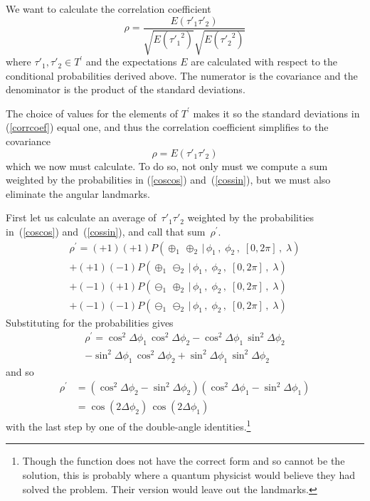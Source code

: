 \documentclass[9pt,technote]{IEEEtran}
\begin{document}
We want to calculate the correlation coefficient
\begin{equation}
  \label{corrcoef}
  \rho = \frac{E(\tau'_1 \tau'_2)}{\sqrt{E({\tau'_1}^2)}\sqrt{E({\tau'_2}^2)}}
\end{equation}
where $\tau'_1, \tau'_2 \in T^{\prime}$ and the expectations $E$ are
calculated with respect to the conditional probabilities derived
above. The numerator is the covariance and the denominator is the
product of the standard deviations.

The choice of values for the elements of $T^{\prime}$ makes it so the
standard deviations in (\ref{corrcoef}) equal one, and thus the
correlation coefficient simplifies to the covariance
\begin{equation}
  \rho = E(\tau'_1 \tau'_2)
\end{equation}
which we now must calculate. To do so, not only must we compute a sum
weighted by the probabilities in (\ref{coscos}) and~(\ref{cossin}),
but we must also eliminate the angular landmarks.

First let us calculate an average of~$\tau'_1 \tau'_2$ weighted by the
probabilities in~(\ref{coscos}) and~(\ref{cossin}), and call that
sum~$\rho^{\prime}$.
\begin{multline}
  \rho^{\prime} 
  = (+1)(+1) P(\oplus_1\,\oplus_2\,|\,\phi_1\,,\; \phi_2\,,\; [0,2\pi]\,,\; \lambda) \\
  + (+1)(-1) P(\oplus_1\,\ominus_2\,|\,\phi_1\,,\; \phi_2\,,\; [0,2\pi]\,,\; \lambda) \\
  + (-1)(+1) P(\ominus_1\,\oplus_2\,|\,\phi_1\,,\; \phi_2\,,\; [0,2\pi]\,,\; \lambda) \\
  + (-1)(-1) P(\ominus_1\,\ominus_2\,|\,\phi_1\,,\; \phi_2\,,\; [0,2\pi]\,,\; \lambda)
\end{multline}
Substituting for the probabilities gives
\begin{multline}
  \rho^{\prime} = \cos^2 \Delta\phi_1\, \cos^2 \Delta\phi_2
  - \cos^2 \Delta\phi_1\, \sin^2 \Delta\phi_2 \\
  - \sin^2 \Delta\phi_1\, \cos^2 \Delta\phi_2
  + \sin^2 \Delta\phi_1\, \sin^2 \Delta\phi_2
\end{multline}
and so
\begin{align}
  \rho^{\prime} &= (\cos^2 \Delta\phi_2 - \sin^2 \Delta\phi_2)
  (\cos^2 \Delta\phi_1 - \sin^2 \Delta\phi_1) \\
  \label{rhoprime}
  &=\cos(2\Delta\phi_2)\,\cos(2\Delta\phi_1)
\end{align}
with the last step by one of the double-angle
identities.\footnote{Though the function does not have the correct
  form and so cannot be the solution, this is probably where a quantum
  physicist would believe they had solved the problem. Their version
  would leave out the landmarks.}
\end{document}

